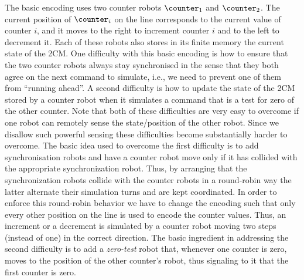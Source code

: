 The basic encoding uses two counter robots $\counter_1$ and $\counter_2$. The current position of $\counter_i$ on the line corresponds to the current value of counter $i$, and it moves to the right to increment counter $i$ and to the left to decrement it. Each of these robots also stores in its finite memory the current state of the 2CM. One difficulty with this basic encoding is how to ensure that the two counter robots always stay synchronised in the sense that they both agree on the next command to simulate, i.e., we need to prevent one of them from ``running ahead''. A second difficulty is how to update the state of the 2CM stored by a counter robot when it simulates a command that is a test for zero of the other counter. Note that both of these difficulties are very easy to overcome if one robot can remotely sense the state/position of the other robot.
Since we disallow such powerful sensing these difficulties become substantially harder to overcome. The basic idea used to overcome the first difficulty is to add synchronisation robots and have a counter robot move only if it has collided with the appropriate synchronization robot. Thus, by arranging that the synchronization robots collide with the counter robots in a round-robin way the latter alternate their simulation turns and are kept coordinated. In order to enforce this round-robin behavior we have to change the encoding such that only every other position on the line is used to encode the counter values. Thus, an increment or a decrement is simulated by a counter robot moving two steps (instead of one) in the correct direction. The basic ingredient in addressing the second difficulty is to add a {\em zero-test} robot that, whenever one counter is zero, moves to the position of the other counter's robot, thus signaling to it that the first counter is zero.

